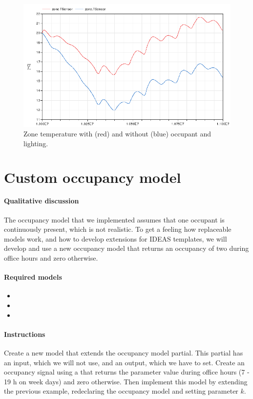 \documentclass[10pt,a4paper]{article}
\begin{document}
\begin{figure}
\centering
\includegraphics[scale=0.7]{Example3.png}
\caption{Zone temperature with (red) and without (blue) occupant and lighting.}
\label{fig:res3}
\end{figure}


\section{Custom occupancy model}
\paragraph{Qualitative discussion}
The occupancy model that we implemented assumes
that one occupant is continuously present,
which is not realistic.
To get a feeling how replaceable models work,
and how to develop extensions for IDEAS templates,
we will develop and use a new occupancy model
that returns an occupancy of two during
office hours and zero otherwise.

\paragraph{Required models}
\begin{itemize}
\item {}
\item {}
\item {}
\end{itemize}

\paragraph{Instructions}
Create a new model that extends the occupancy model partial.
This partial has an input, which we will not use, and an output, which we have to set.
Create an occupancy signal using a  that
returns the parameter value  during office hours 
(7 - 19 h on week days) and zero otherwise.
Then implement this model by extending the previous example, 
redeclaring the occupancy model and setting parameter $k$.
\end{document}
